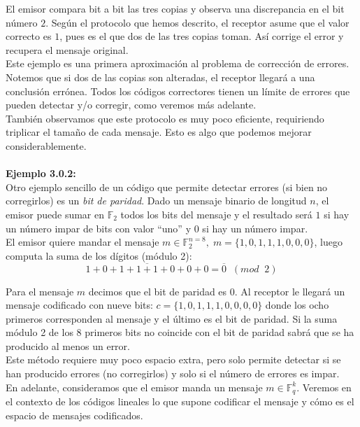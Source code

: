 \documentclass[11pt,spanish]{book}
\begin{document}
El emisor compara bit a bit las tres copias y observa una discrepancia en el bit número $2$. Según el protocolo que hemos descrito, el receptor asume que el valor correcto es $1$, pues es el que dos de las tres copias toman. Así corrige el error y recupera el mensaje original.\\

Este ejemplo es una primera aproximación al problema de corrección de errores. Notemos que si dos de las copias son alteradas, el receptor llegará a una conclusión errónea. Todos los códigos correctores tienen un límite de errores que pueden detectar y/o corregir, como veremos más adelante.\\

También observamos que este protocolo es muy poco eficiente, requiriendo triplicar el tamaño de cada mensaje. Esto es algo que podemos mejorar considerablemente.\\
\\ \hypertarget{ejemplo2}{\textbf{Ejemplo 3.0.2:}} \\

Otro ejemplo sencillo de un código que permite detectar errores (si bien no corregirlos) es un \textit{bit de paridad}. Dado un mensaje binario de longitud $n$, el emisor puede sumar en $\mathbb{F}_{2}$ todos los bits del mensaje y el resultado será $1$ si hay un número impar de bits con valor ``uno'' y $0$ si hay un número impar.\\

El emisor quiere mandar el mensaje $m\in\mathbb{F}_{2}^{n=8},\; m=\{1,0,1,1,1,0,0,0\}$, luego computa la suma de los dígitos (módulo 2):   $$\overline{1+0+1+1+1+0+0+0}=\overline{0}\;\;(mod\;\; 2)$$

Para el mensaje $m$ decimos que el bit de paridad es $0$. Al receptor le llegará un mensaje codificado con nueve bits: $c=\{1,0,1,1,1,0,0,0,0\}$ donde los ocho primeros corresponden al mensaje y el último es el bit de paridad. Si la suma módulo 2 de los 8 primeros bits no coincide con el bit de paridad sabrá que se ha producido al menos un error.\\

Este método requiere muy poco espacio extra, pero solo permite detectar si se han producido errores (no corregirlos) y solo si el número de errores es impar. \\

En adelante, consideramos que el emisor manda un mensaje $m\in\mathbb{F}_{q}^{k}$. Veremos en el contexto de los códigos lineales lo que supone codificar el mensaje y cómo es el espacio de mensajes codificados.
\end{document}
